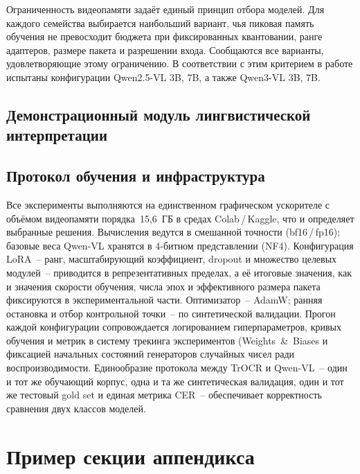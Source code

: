 \documentclass[a4paper,12pt]{extarticle}
\begin{document}
Ограниченность видеопамяти задаёт единый принцип отбора моделей. Для каждого семейства выбирается наибольший вариант, чья пиковая память обучения не превосходит бюджета при фиксированных квантовании, ранге адаптеров, размере пакета и разрешении входа. Сообщаются все варианты, удовлетворяющие этому ограничению. В соответствии с этим критерием в работе испытаны конфигурации Qwen2.5-VL 3B, 7B, а также Qwen3-VL 3B, 7B.
 
\subsection{Демонстрационный модуль лингвистической интерпретации}
\label{sec:method-interp}

 
\subsection{Протокол обучения и инфраструктура}
\label{sec:method-infra}
 
Все эксперименты выполняются на единственном графическом ускорителе с объёмом видеопамяти порядка~15,6~ГБ в средах Colab\,/\,Kaggle, что и определяет выбранные решения. Вычисления ведутся в смешанной точности (bf16\,/\,fp16); базовые веса Qwen-VL хранятся в 4-битном представлении (NF4). Конфигурация LoRA~-- ранг, масштабирующий коэффициент, dropout и множество целевых модулей~-- приводится в репрезентативных пределах, а её итоговые значения, как и значения скорости обучения, числа эпох и эффективного размера пакета фиксируются в экспериментальной части. Оптимизатор~-- AdamW; ранняя остановка и отбор контрольной точки~-- по синтетической валидации. Прогон каждой конфигурации сопровождается логированием гиперпараметров, кривых обучения и метрик в систему трекинга экспериментов (Weights~\&~Biases\) и фиксацией начальных состояний генераторов случайных чисел ради воспроизводимости. Единообразие протокола между TrOCR и Qwen-VL~-- один и тот же обучающий корпус, одна и та же синтетическая валидация, один и тот же тестовый gold set и единая метрика CER~-- обеспечивает корректность сравнения двух классов моделей.
\newpage 
\printbibliography[heading=bibintoc] 

	
\newpage
\appendix

\section{Пример секции аппендикса}
\end{document}
